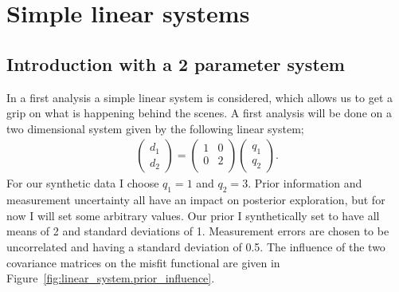 \section{Simple linear systems}

\subsection{Introduction with a 2 parameter system}
In a first analysis a simple linear system is considered, which allows us to get a grip on what is happening behind the scenes. A first analysis will be done on a two dimensional system given by the following linear system;
\begin{gather}\label{eq:linear_system.system}
	\begin{pmatrix}
	d_1\\
	d_2
	\end{pmatrix}
	=
	\begin{pmatrix}
	1 & 0\\
	0 & 2\\
	\end{pmatrix}
	\begin{pmatrix}
	q_1\\q_2
	\end{pmatrix}.
\end{gather}
For our synthetic data I choose $q_1 = 1$ and $q_2 = 3$. Prior information and measurement uncertainty all have an impact on posterior exploration, but for now I will set some arbitrary values. Our prior I synthetically set to have all means of 2 and standard deviations of 1. Measurement errors are chosen to be uncorrelated and having a standard deviation of 0.5. The influence of the two covariance matrices on the misfit functional are given in Figure~\ref{fig:linear_system.prior_influence}.

